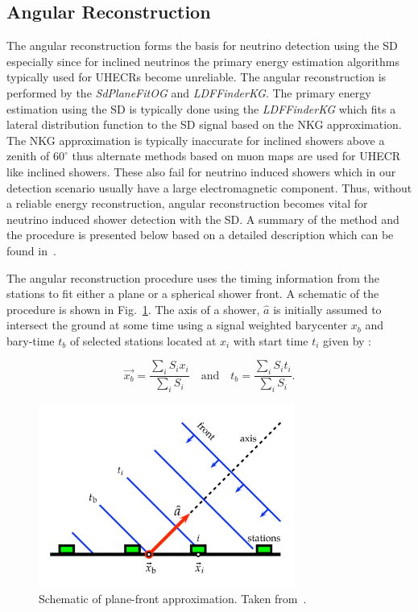 \subsection{Angular Reconstruction}
\label{subsec:angular_reco}

The angular reconstruction forms the basis for neutrino detection using the SD especially since for inclined neutrinos the primary energy estimation algorithms typically used for UHECRs become unreliable. The angular reconstruction is performed by the \textit{SdPlaneFitOG} and \textit{LDFFinderKG}. The primary energy estimation using the SD is typically done using the \textit{LDFFinderKG} which fits a lateral distribution function to the SD signal based on the NKG approximation. The NKG approximation is typically inaccurate for inclined showers above a zenith of $60^{\circ}$ thus alternate methods based on muon maps are used for UHECR like inclined showers. These also fail for neutrino induced showers which in our detection scenario usually have a large electromagnetic component. Thus, without a reliable energy reconstruction, angular reconstruction becomes vital for neutrino induced shower detection with the SD. A summary of the method and the procedure is presented below based on a detailed description which can be found in~\cite{PierreAuger:2020yab}. 

The angular reconstruction procedure uses the timing information from the stations to fit either a plane or a spherical shower front. A schematic of the procedure is shown in Fig.~\ref{fig:Plane_fit}. The axis of a shower, $\hat{a}$ is initially assumed to intersect the ground at some time using a signal weighted barycenter $x_b$ and bary-time $t_b$ of selected stations located at $x_i$ with start time $t_i$ given by :

\begin{equation}
  \vec{x_{b}} = \frac{\sum_{i} S_i x_i}{\sum_{i} S_i} \quad \text{and} \quad t_b = \frac{\sum_{i} S_i t_i}{\sum_{i} S_i}.
\end{equation}

\begin{figure}[t!]
  \centering
  \includegraphics[width=0.75\textwidth]{thesis_figures/Nu_analysis/Plane_fit.pdf}
  \caption{Schematic of plane-front approximation. Taken from~\cite{PierreAuger:2020yab}.}
  \label{fig:Plane_fit}
  \end{figure}

